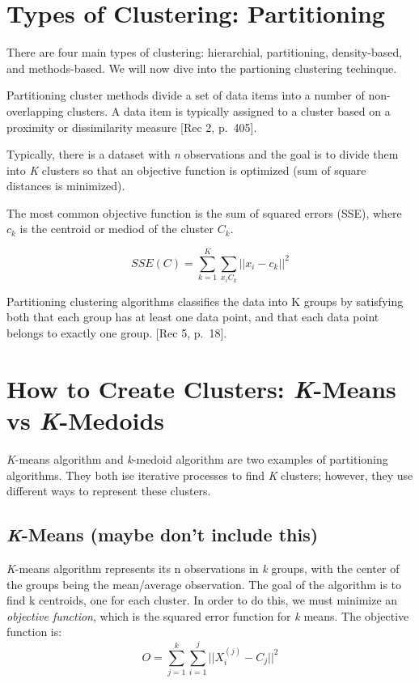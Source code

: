 \documentclass[12pt,twoside]{amherstthesis}
\begin{document}
  \section{Types of Clustering:
  Partitioning}\label{types-of-clustering-partitioning}
  
  There are four main types of clustering: hierarchial, partitioning,
  density-based, and methods-based. We will now dive into the partioning
  clustering techinque.
  
  Partitioning cluster methods divide a set of data items into a number of
  non-overlapping clusters. A data item is typically assigned to a cluster
  based on a proximity or dissimilarity measure {[}Rec 2, p.~405{]}.
  
  Typically, there is a dataset with \emph{n} observations and the goal is
  to divide them into \emph{K} clusters so that an objective function is
  optimized (sum of square distances is minimized).
  
  The most common objective function is the sum of squared errors (SSE),
  where \(c_k\) is the centroid or mediod of the cluster \(C_k\).
  
  \[SSE(C)= \sum_{k=1}^K \sum_{x_{i}C_{k}} ||{x_i}- c_k||^2\]
  
  Partitioning clustering algorithms classifies the data into K groups by
  satisfying both that each group has at least one data point, and that
  each data point belongs to exactly one group. {[}Rec 5, p.~18{]}.
  
  \section{\texorpdfstring{How to Create Clusters: \emph{K}-Means vs
  \emph{K}-Medoids}{How to Create Clusters: K-Means vs K-Medoids}}\label{how-to-create-clusters-k-means-vs-k-medoids}
  
  \emph{K}-means algorithm and \emph{k}-medoid algorithm are two examples
  of partitioning algorithms. They both ise iterative processes to find
  \emph{K} clusters; however, they use different ways to represent these
  clusters.
  
  \subsection{\texorpdfstring{\emph{K}-Means (maybe don't include
  this)}{K-Means (maybe don't include this)}}\label{k-means-maybe-dont-include-this}
  
  \emph{K}-means algorithm represents its n observations in \emph{k}
  groups, with the center of the groups being the mean/average
  observation. The goal of the algorithm is to find k centroids, one for
  each cluster. In order to do this, we must minimize an \emph{objective
  function}, which is the squared error function for \emph{k} means. The
  objective function is:
  \[O= \sum_{j=1}^k \sum_{i=1}^j ||{{X_i^{(j)}- C_j}}||^2\]
  
\end{document}

